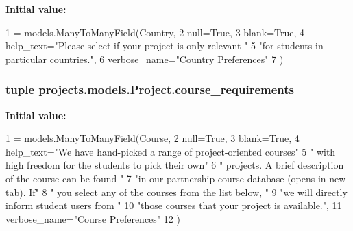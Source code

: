 {\bfseries Initial value\-:}
\begin{DoxyCode}
1 = models.ManyToManyField(Country,
2                                                   null=\textcolor{keyword}{True},
3                                                   blank=\textcolor{keyword}{True},
4                                                   help\_text=\textcolor{stringliteral}{"Please select if your project is only relevant
       "}
5                                                             \textcolor{stringliteral}{"for students in particular countries."},
6                                                   verbose\_name=\textcolor{stringliteral}{"Country Preferences"}
7     )
\end{DoxyCode}
\hypertarget{classprojects_1_1models_1_1_project_a9c306c9ac4d1b984e7e9e1339e48a0e7}{
\subsubsection[{course\-\_\-requirements}]{\setlength{\rightskip}{0pt plus 5cm}tuple projects.\-models.\-Project.\-course\-\_\-requirements\hspace{0.3cm}{\ttfamily [static]}}}\label{classprojects_1_1models_1_1_project_a9c306c9ac4d1b984e7e9e1339e48a0e7}
{\bfseries Initial value\-:}
\begin{DoxyCode}
1 = models.ManyToManyField(Course,
2                                                  null=\textcolor{keyword}{True},
3                                                  blank=\textcolor{keyword}{True},
4                                                  help\_text=\textcolor{stringliteral}{"We have hand-picked a range of project-oriented
       courses"}
5                                                            \textcolor{stringliteral}{" with high freedom for the students to pick
       their own"}
6                                                            \textcolor{stringliteral}{" projects. A brief description of the course
       can be found "}
7                                                            \textcolor{stringliteral}{"in our partnership course database (opens in
       new tab). If"}
8                                                            \textcolor{stringliteral}{" you select any of the courses from the list
       below, "}
9                                                            \textcolor{stringliteral}{"we will directly inform student users from "}
10                                                            \textcolor{stringliteral}{"those courses that your project is available."},
11                                                  verbose\_name=\textcolor{stringliteral}{"Course Preferences"}
12     )
\end{DoxyCode}
